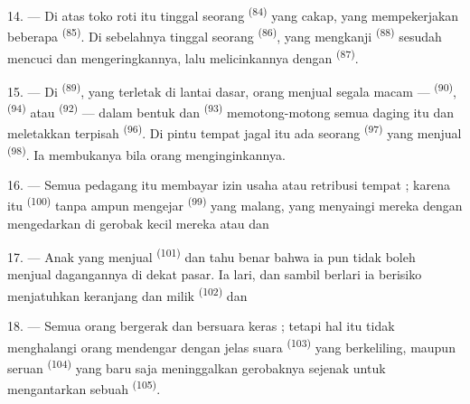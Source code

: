 14. --- Di atas toko roti itu tinggal seorang 
\textsuperscript{(84)} yang cakap, yang mempekerjakan beberapa
 \textsuperscript{(85)}. Di sebelahnya tinggal seorang
 \textsuperscript{(86)}, yang mengkanji
 \textsuperscript{(88)} sesudah mencuci dan
mengeringkannya, lalu melicinkannya dengan 
\textsuperscript{(87)}.

\VUsaut{4.0mm}
\VUsaut{3.0mm}

15. --- Di  \textsuperscript{(89)}, yang terletak
di lantai dasar, orang menjual segala macam  —
 \textsuperscript{(90)}, 
\textsuperscript{(94)} atau 
\textsuperscript{(92)} — dalam bentuk  dan  
\textsuperscript{(93)} memotong-motong semua daging itu dan meletakkan
terpisah  \textsuperscript{(96)}. Di pintu
tempat jagal itu ada seorang 
\textsuperscript{(97)} yang menjual  \textsuperscript{(98)}.
Ia membukanya bila orang menginginkannya.

16. --- Semua pedagang itu membayar izin usaha atau retribusi tempat ;
karena itu  \textsuperscript{(100)} tanpa ampun mengejar
 \textsuperscript{(99)} yang malang, yang
menyaingi mereka dengan mengedarkan di gerobak kecil mereka
 atau  dan

\VUsaut{4.0mm}
\VUsaut{3.0mm}

17. --- Anak yang menjual  \textsuperscript{(101)}
dan  tahu benar bahwa ia pun tidak boleh menjual
dagangannya di dekat pasar. Ia lari, dan sambil berlari ia berisiko
menjatuhkan keranjang  
dan  milik  \textsuperscript{(102)}
 dan 

18. --- Semua orang bergerak dan bersuara keras ; tetapi hal itu tidak
menghalangi orang mendengar dengan jelas suara 
\textsuperscript{(103)} yang berkeliling, maupun seruan  \textsuperscript{(104)} yang baru saja meninggalkan gerobaknya
sejenak untuk mengantarkan sebuah 
\textsuperscript{(105)}.

\VUsaut{6.0mm}
\VUfilet{22mm}
